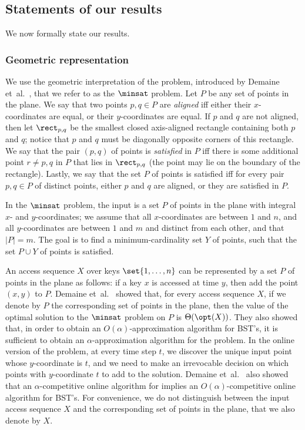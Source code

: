 \documentclass{toc}
\begin{document}
\subsection{Statements of our results}

We now formally state our results.

\subsubsection{Geometric representation} 

%



 
We use the geometric interpretation of the
problem, introduced by Demaine et~al.~\cite{DHIKP09}, that we refer to as the $\minsat$ problem. 
Let $P$ be any set of points in the plane. We say that two points $p,q\in P$ are \emph{aligned} iff either their $x$-coordinates are equal, or their $y$-coordinates are equal. If $p$ and $q$ are not aligned, then  let $\rect_{p,q}$ be the smallest closed axis-aligned rectangle containing both $p$ and $q$; notice that $p$ and $q$ must be diagonally opposite corners of this rectangle. We say that the pair $(p,q)$ of points is \emph{satisfied} in $P$ iff there is some additional point $r\neq p,q$ in $P$ that lies in $\rect_{p,q}$ (the point may lie on the boundary of the rectangle).
Lastly, we say that the set $P$ of points is satisfied iff for every pair $p,q\in P$ of distinct points, either $p$ and $q$ are aligned, or they are satisfied in $P$.

In the $\minsat$ problem, the input is a set $P$ of points in the plane with integral $x$- and $y$-coordinates; we assume that all $x$-coordinates are between $1$ and $n$, and all $y$-coordinates are between $1$ and $m$ and distinct from each other, and that $|P|=m$. The goal is to find a minimum-cardinality set $Y$ of points, such that the set $P\cup Y$ of points is satisfied.

An access sequence $X$ over keys $\set{1,\ldots,n}$ can be represented by a set $P$ of points in the plane as follows:
if a key $x$ is accessed at time $y$, then add the point $(x,y)$ to $P$.
Demaine et~al.~\cite{DHIKP09} showed that, for every access sequence $X$, if we denote by $P$ the corresponding set of points in the plane, then the value of the optimal solution to the $\minsat$ problem on $P$ is $\Theta(\opt(X))$. They also showed that, in order to obtain an $O(\alpha)$-approximation algorithm for BST's, it is sufficient to obtain an $\alpha$-approximation algorithm for the \minsat problem. In the online version of the \minsat problem, at every time step $t$, we discover the unique input point whose $y$-coordinate is $t$, and we need to make an irrevocable decision on which points with $y$-coordinate $t$ to add to the solution. Demaine et~al.~\cite{DHIKP09} also showed that an $\alpha$-competitive online algorithm for \minsat implies an $O(\alpha)$-competitive online algorithm for BST's.
For convenience, we do not distinguish between the input access sequence $X$ and the corresponding set of points in the plane, that we also denote by $X$.
\end{document}
